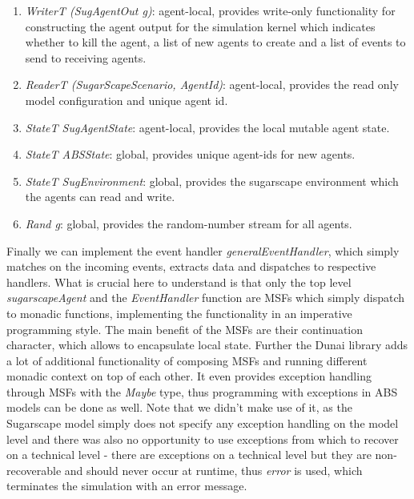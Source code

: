 \begin{enumerate}
	\item \textit{WriterT (SugAgentOut g)}: agent-local, provides write-only functionality for constructing the agent output for the simulation kernel which indicates whether to kill the agent, a list of new agents to create and a list of events to send to receiving agents.
	
	\item \textit{ReaderT (SugarScapeScenario, AgentId)}: agent-local, provides the read only model configuration and unique agent id.

	\item \textit{StateT SugAgentState}: agent-local, provides the local mutable agent state.

	\item \textit{StateT ABSState}: global, provides unique agent-ids for new agents. %

	\item \textit{StateT SugEnvironment}: global, provides the sugarscape environment which the agents can read and write.

	\item \textit{Rand g}: global, provides the random-number stream for all agents.
\end{enumerate}

Finally we can implement the event handler \textit{generalEventHandler}, which simply matches on the incoming events, extracts data and dispatches to respective handlers. What is crucial here to understand is that only the top level \textit{sugarscapeAgent} and the \textit{EventHandler} function are MSFs which simply dispatch to monadic functions, implementing the functionality in an imperative programming style. The main benefit of the MSFs are their continuation character, which allows to encapsulate local state. Further the Dunai library adds a lot of additional functionality of composing MSFs and running different monadic context on top of each other. It even provides exception handling through MSFs with the \textit{Maybe} type, thus programming with exceptions in ABS models can be done as well. Note that we didn't make use of it, as the Sugarscape model simply does not specify any exception handling on the model level and there was also no opportunity to use exceptions from which to recover on a technical level - there are exceptions on a technical level but they are non-recoverable and should never occur at runtime, thus \textit{error} is used, which terminates the simulation with an error message.

